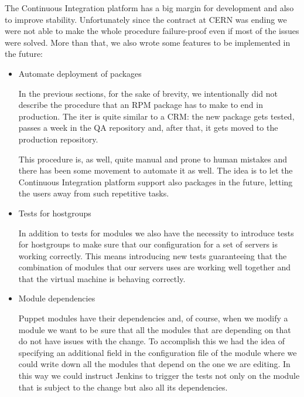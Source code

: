 The Continuous Integration platform has a big margin for development and
also to improve stability. Unfortunately since the contract at CERN was
ending we were not able to make the whole procedure failure-proof even if
most of the issues were solved. More than that, we also wrote some
features to be implemented in the future:

\begin{itemize}

  \item Automate deployment of packages

  In the previous sections, for the sake of brevity, we intentionally did
  not describe the procedure that an RPM package has to make to end in
  production. The iter is quite similar to a CRM: the new package gets
  tested, passes a week in the QA repository and, after that, it gets
  moved to the production repository.

  This procedure is, as well, quite manual and prone to human mistakes and
  there has been some movement to automate it as well. The idea is to let
  the Continuous Integration platform support also packages in the future,
  letting the users away from such repetitive tasks.

  \item Tests for hostgroups

  In addition to tests for modules we also have the necessity to introduce
  tests for hostgroups to make sure that our configuration for a set of
  servers is working correctly. This means introducing new tests
  guaranteeing that the combination of modules that our servers uses are
  working well together and that the virtual machine is behaving
  correctly.

  \item Module dependencies

  Puppet modules have their dependencies and, of course, when we modify
  a module we want to be sure that all the modules that are depending on
  that do not have issues with the change. To accomplish this we had the
  idea of specifying an additional field in the configuration file of the
  module where we could write down all the modules that depend on the one
  we are editing. In this way we could instruct Jenkins to trigger the
  tests not only on the module that is subject to the change but also all
  its dependencies.

\end{itemize}
